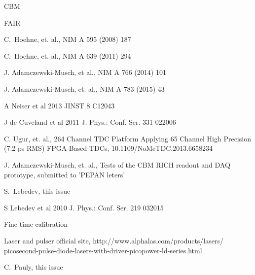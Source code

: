 \documentclass[final,5p,times,twocolumn]{elsarticle}
\begin{document}
\begin{thebibliography}{99}

CBM

FAIR

C.~Hoehne, et. al.,
NIM A 595 (2008) 187

C.~Hoehne, et. al.,
NIM A 639 (2011) 294

J. Adamczewski-Musch, et al.,
NIM A 766 (2014) 101

J. Adamczewski-Musch, et. al.,
NIM A 783 (2015) 43

A Neiser et al 2013 JINST 8 C12043

J de Cuveland et al 2011 J. Phys.: Conf. Ser. 331 022006

C. Ugur, et. al.,
264 Channel TDC Platform Applying 65 Channel High Precision (7.2 ps RMS) FPGA Based TDCs,
10.1109/NoMeTDC.2013.6658234

J. Adamczewski-Musch, et. al.,
Tests of the CBM RICH readout and DAQ prototype,
submitted to 'PEPAN leters'

S.~Lebedev,
this issue

S Lebedev et al 2010 J. Phys.: Conf. Ser. 219 032015 

Fine time calibration

Laser and pulser official site,
http://www.alphalas.com/products/lasers/ picosecond-pulse-diode-lasers-with-driver-picopower-ld-series.html

C.~Pauly,
this issue

\end{thebibliography}

\end{document}
